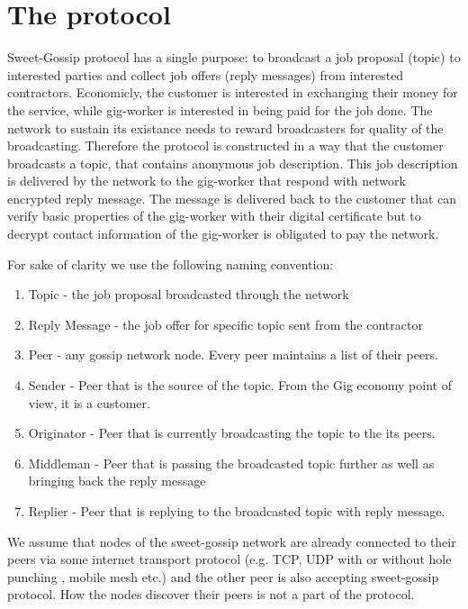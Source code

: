 \documentclass{article}
\begin{document}
\section{The protocol}

Sweet-Gossip protocol has a single purpose: to broadcast a job proposal (topic) to interested parties and collect job offers (reply messages) from interested contractors. Economicly, the customer is interested in exchanging their money for the service, while gig-worker is interested in being paid for the job done. The network to sustain its existance needs to reward broadcasters for quality of the broadcasting. Therefore the protocol is constructed in a way that the customer broadcasts a topic, that contains anonymous job description. This job description is delivered by the network to the gig-worker that respond with network encrypted reply message. The message is delivered back to the customer that can verify basic properties of the gig-worker with their digital certificate but to decrypt contact information of the gig-worker is obligated to pay the network.

For sake of clarity we use the following naming convention:

\begin{enumerate}
	\item Topic - the job proposal broadcasted through the network
	\item Reply Message - the job offer for specific topic sent from the contractor
	\item Peer - any gossip network node. Every peer maintains a list of their peers.
	\item Sender - Peer that is the source of the topic. From the Gig economy point of view, it is a customer.
	\item Originator - Peer that is currently broadcasting the topic to the its peers.
	\item Middleman - Peer that is passing the broadcasted topic further as well as bringing back the reply message
	\item Replier - Peer that is replying to the broadcasted topic with reply message.
\end{enumerate}

We assume that nodes of the sweet-gossip network are already connected to their peers via some internet transport protocol (e.g. TCP, UDP with or without hole punching \cite{WebRTC}, mobile mesh etc.) and the other peer is also accepting sweet-gossip protocol. How the nodes discover their peers is not a part of the protocol.
\end{document}
